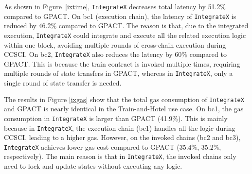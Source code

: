 As shown in Figure~\ref{ixtime}, \texttt{IntegrateX} decreases total latency by 51.2\% compared to GPACT. 
On bc1 (execution chain), the latency of \texttt{IntegrateX} is reduced by 46.2\% compared to GPACT.
The reason is that, due to the integrated execution, \texttt{IntegrateX} could integrate and execute all the related execution logic within one block, avoiding multiple rounds of cross-chain execution during CCSCI.
On bc2, \texttt{IntegrateX} also reduces the latency by 60\% compared to GPACT.
This is because the train contract is invoked multiple times, requiring multiple rounds of state transfers in GPACT, whereas in \texttt{IntegrateX}, only a single round of state transfer is needed.

The results in Figure \ref{ixgas} show that the total gas consumption of \texttt{IntegrateX} and GPACT is nearly identical in the Train-and-Hotel use case. 
On bc1, the gas consumption in \texttt{IntegrateX} is larger than GPACT (41.9\%).
This is mainly because in \texttt{IntegrateX}, the execution chain (bc1) handles all the logic during CCSCI, leading to a higher gas.
However, on the invoked chains (bc2 and bc3), \texttt{IntegrateX} achieves lower gas cost compared to GPACT (35.4\%, 35.2\%, respectively).
The main reason is that in \texttt{IntegrateX}, the invoked chains only need to lock and update states without executing any logic. 




